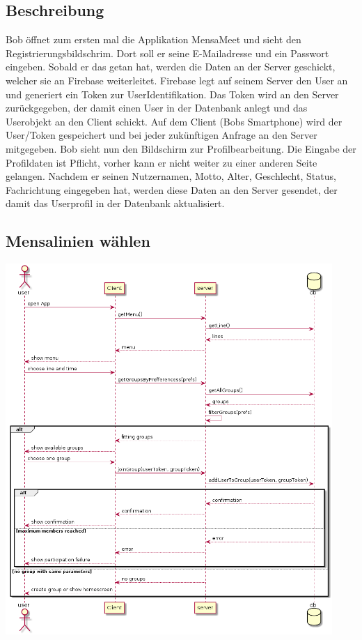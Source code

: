 \documentclass[a4paper]{scrreprt}
\begin{document}
\subsection*{Beschreibung}
Bob öffnet zum ersten mal die \Gls{Applikation} MensaMeet und sieht den Registrierungsbildschrim. Dort soll er seine E-Mailadresse und ein Passwort eingeben. Sobald er das getan hat, werden die Daten an der Server geschickt, welcher sie an Firebase weiterleitet. Firebase legt auf seinem Server den User an und generiert ein Token zur UserIdentifikation. Das Token wird an den Server zurückgegeben, der damit einen User in der Datenbank anlegt und das Userobjekt an den Client schickt. Auf dem Client (Bobs Smartphone) wird der User/Token gespeichert und bei jeder zukünftigen Anfrage an den Server mitgegeben. 
Bob sieht nun den Bildschirm zur Profilbearbeitung. Die Eingabe der Profildaten ist Pflicht, vorher kann er nicht weiter zu einer anderen Seite gelangen.
Nachdem er seinen Nutzernamen, Motto, Alter, Geschlecht, Status, Fachrichtung eingegeben hat, werden diese Daten an den Server gesendet, der damit das Userprofil in der Datenbank aktualisiert. 
\newpage
\subsection{Mensalinien wählen}
\begin{center}
	\includegraphics[width=0.93\textwidth]{Sequenzdiagramme/chooseLineAndTimeSD.png}
\end{center}
\end{document}
